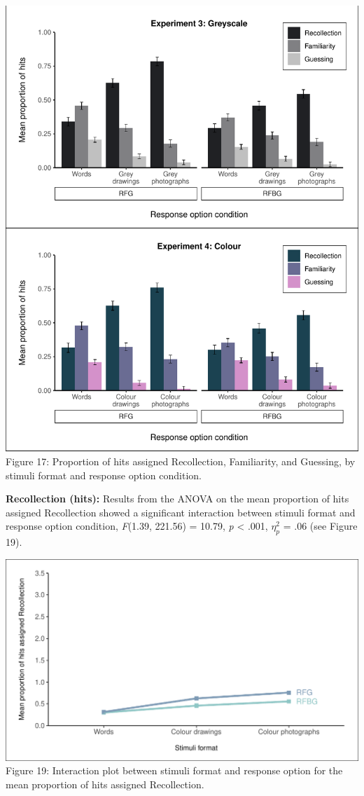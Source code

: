 \documentclass[
  11pt,
]{article}
\begin{document}
\includegraphics{R--Thesis_files/figure-latex/unnamed-chunk-53-1.pdf}
Figure 17: Proportion of hits assigned Recollection, Familiarity, and
Guessing, by stimuli format and response option condition.

\textbf{Recollection (hits):} Results from the ANOVA on the mean
proportion of hits assigned Recollection showed a significant
interaction between stimuli format and response option condition,
\emph{F}(1.39, 221.56) = 10.79, \emph{p} \textless{} .001, \(\eta^2_p\)
= .06 (see Figure 19).

\includegraphics{R--Thesis_files/figure-latex/unnamed-chunk-55-1.pdf}
Figure 19: Interaction plot between stimuli format and response option
for the mean proportion of hits assigned Recollection.
\end{document}
